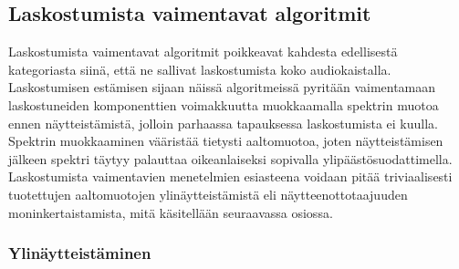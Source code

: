 \documentclass[finnish,12pt,a4paper,pdftex]{article} %
\begin{document}
\subsection{Laskostumista vaimentavat algoritmit}

Laskostumista vaimentavat algoritmit poikkeavat kahdesta edellisestä kategoriasta siinä, että ne sallivat laskostumista koko audiokaistalla. Laskostumisen estämisen sijaan näissä algoritmeissä pyritään vaimentamaan laskostuneiden komponenttien voimakkuutta muokkaamalla spektrin muotoa ennen näytteistämistä, jolloin parhaassa tapauksessa laskostumista ei kuulla. Spektrin muokkaaminen vääristää tietysti aaltomuotoa, joten näytteistämisen jälkeen spektri täytyy palauttaa oikeanlaiseksi sopivalla ylipäästösuodattimella. Laskostumista vaimentavien menetelmien esiasteena voidaan pitää triviaalisesti tuotettujen aaltomuotojen ylinäytteistämistä eli näytteenottotaajuuden moninkertaistamista, mitä käsitellään seuraavassa osiossa.

\subsubsection{Ylinäytteistäminen}
\end{document}
